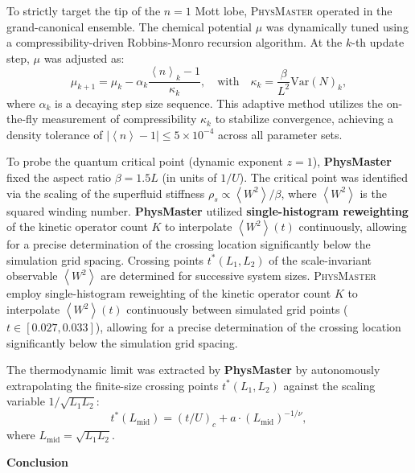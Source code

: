 \documentclass[11pt, a4paper, logo, copyright, nonumbering]{SAI}
\newcommand{\agent}{\textsc{PhysMaster}\xspace}
\newcommand{\ave}[1]{\left\langle #1 \right\rangle}
\begin{document}
To strictly target the tip of the $n=1$ Mott lobe, \agent operated in the grand-canonical ensemble. The chemical potential $\mu$ was dynamically tuned using a compressibility-driven Robbins-Monro recursion algorithm. At the $k$-th update step, $\mu$ was adjusted as:
\begin{equation}
\mu_{k+1} = \mu_k - \alpha_k \frac{\ave{n}_k - 1}{\kappa_k}, \quad \text{with} \quad \kappa_k = \frac{\beta}{L^2} \text{Var}(N)_k,
\end{equation}
where $\alpha_k$ is a decaying step size sequence. This adaptive method utilizes the on-the-fly measurement of compressibility $\kappa_k$ to stabilize convergence, achieving a density tolerance of $|\ave{n} - 1| \leq 5 \times 10^{-4}$ across all parameter sets.

To probe the quantum critical point (dynamic exponent $z=1$), \textbf{PhysMaster} fixed the aspect ratio $\beta = 1.5 L$ (in units of $1/U$). The critical point was identified via the scaling of the superfluid stiffness $\rho_s \propto \ave{W^2}/\beta$, where $\ave{W^2}$ is the squared winding number. \textbf{PhysMaster} utilized \textbf{single-histogram reweighting} of the kinetic operator count $K$ to interpolate $\ave{W^2}(t)$ continuously, allowing for a precise determination of the crossing location significantly below the simulation grid spacing. Crossing points $t^*(L_1, L_2)$ of the scale-invariant observable $\ave{W^2}$ are determined for successive system sizes. \agent employ single-histogram reweighting of the kinetic operator count $K$ to interpolate $\ave{W^2}(t)$ continuously between simulated grid points ($t \in [0.027, 0.033]$), allowing for a precise determination of the crossing location significantly below the simulation grid spacing.

The thermodynamic limit was extracted by \textbf{PhysMaster} by autonomously extrapolating the finite-size crossing points $t^*(L_1, L_2)$ against the scaling variable $1/\sqrt{L_1 L_2}$:
\begin{equation}
t^*(L_{\text{mid}}) = (t/U)_c + a \cdot (L_{\text{mid}})^{-1/\nu},
\end{equation}
where $L_{\text{mid}} = \sqrt{L_1 L_2}$.

\noindent \textbf{Conclusion}
\end{document}
